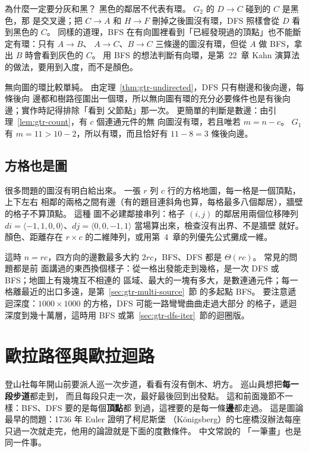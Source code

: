 為什麼一定要分灰和黑？ 黑色的鄰居不代表有環。 $G_2$ 的 $D \to C$ 碰到的 $C$ 是黑色，那
是交叉邊；把 $C \to A$ 和 $H \to F$ 刪掉之後圖沒有環，DFS 照樣會從 $D$ 看到黑色的 $C$。
同樣的道理，BFS 在有向圖裡看到「已經發現過的頂點」也不能斷定有環：只有 $A \to B$、
$A \to C$、$B \to C$ 三條邊的圖沒有環，但從 $A$ 做 BFS，拿出 $B$ 時會看到灰色的 $C$。 用
BFS 的想法判斷有向環，是第~22~章 Kahn 演算法的做法，要用到入度，而不是顏色。

無向圖的環比較單純。 由定理~\ref{thm:gtr-undirected}，DFS 只有樹邊和後向邊，每條後向
邊都和樹路徑圍出一個環，所以無向圖有環的充分必要條件也是有後向邊；實作時記得排除「看到
父節點」那一次。 更簡單的判斷是數邊：由引理~\ref{lem:gtr-count}，有 $c$ 個連通元件的無
向圖沒有環，若且唯若 $m = n - c$。 $G_1$ 有 $m = 11 > 10 - 2$，所以有環，而且恰好有
$11 - 8 = 3$ 條後向邊。

\subsection{方格也是圖}

很多問題的圖沒有明白給出來。 一張 $r$ 列 $c$ 行的方格地圖，每一格是一個頂點，上下左右
相鄰的兩格之間有邊（有的題目連斜角也算，每格最多八個鄰居），牆壁的格子不算頂點。 這種
圖不必建鄰接串列：格子 $(i, j)$ 的鄰居用兩個位移陣列 $\mathit{di} = \langle -1, 1, 0, 0
\rangle$、$\mathit{dj} = \langle 0, 0, -1, 1 \rangle$ 當場算出來，檢查沒有出界、不是牆壁
就好。 顏色、距離存在 $r \times c$ 的二維陣列，或用第~4~章的列優先公式攤成一維。

這時 $n = rc$，四方向的邊數最多大約 $2rc$，BFS、DFS 都是 $\Theta(rc)$。 常見的問題都是前
面講過的東西換個樣子：從一格出發能走到幾格，是一次 DFS 或 BFS；地圖上有幾塊互不相連的
區域、最大的一塊有多大，是數連通元件；每一格離最近的出口多遠，是第~\ref{sec:gtr-multi-source}~節
的多起點 BFS。 要注意遞迴深度：$1000 \times 1000$ 的方格，DFS 可能一路彎彎曲曲走過大部分
的格子，遞迴深度到幾十萬層，這時用 BFS 或第~\ref{sec:gtr-dfs-iter}~節的迴圈版。

\section{歐拉路徑與歐拉迴路}
\label{sec:gtr-euler}

登山社每年開山前要派人巡一次步道，看看有沒有倒木、坍方。 巡山員想把\textbf{每一段步道}都走到，
而且每段只走一次，最好最後回到出發點。 這和前面幾節不一樣：BFS、DFS 要的是每個\textbf{頂點}都
到過，這裡要的是每一條\textbf{邊}都走過。 這是圖論最早的問題：1736 年 Euler 證明了柯尼斯堡
（Königsberg）的七座橋沒辦法每座只過一次就走完，他用的論證就是下面的度數條件。 中文常說的
「一筆畫」也是同一件事。

